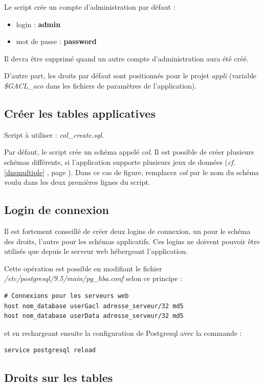 Le script crée un compte d'administration par défaut :
\begin{itemize}
\item login : \textbf{admin}
\item mot de passe : \textbf{password}
\end{itemize}

Il devra être supprimé quand un autre compte d'administration aura été créé.

D'autre part, les droits par défaut sont positionnés pour le projet \textit{appli} (variable \textit{\$GACL\_aco} dans les fichiers de paramètres de l'application).


\subsection{Créer les tables applicatives}
Script à utiliser : \textit{col\_create.sql}.

Par défaut, le script crée un schéma appelé \textit{col}. Il est possible de créer plusieurs schémas différents, si l'application supporte plusieurs jeux de données (\textit{cf.} \ref{dnsmultiple} \textit{}, page \pageref{dnsmultiple}). Dans ce cas de figure, remplacez \textit{col} par le nom du schéma voulu dans les deux premières lignes du script.

\subsection{Login de connexion}

Il est fortement conseillé de créer deux logins de connexion, un pour le schéma des droits, l'autre pour les schémas applicatifs. Ces logins ne doivent pouvoir être utilisés que depuis le serveur web hébergeant l'application.

Cette opération est possible en modifiant le fichier \textit{/etc/postgresql/9.5/main/pg\_hba.conf} selon ce principe :

\begin{lstlisting}
# Connexions pour les serveurs web 
host nom_database userGacl adresse_serveur/32 md5 
host nom_database userData adresse_serveur/32 md5
\end{lstlisting}

et en rechargeant ensuite la configuration de Postgresql avec la commande :
\begin{lstlisting}
service postgresql reload
\end{lstlisting}

\subsection{Droits sur les tables}

